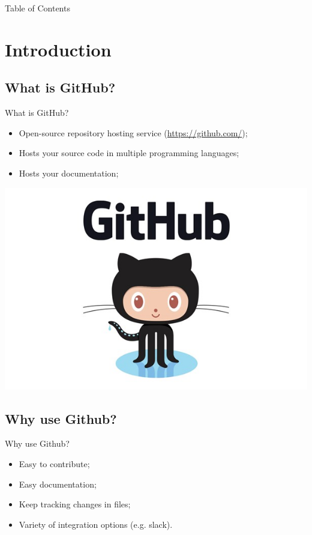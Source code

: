 \begin{noheadline}

\begin{frame}[allowframebreaks]{Table of Contents}

\tableofcontents

\end{frame}

\end{noheadline}


\section{Introduction}

\subsection{What is GitHub?}
\begin{frame}{What is GitHub?}
    \begin{itemize}

        \item Open-source repository hosting service (\href{https://github.com/}{https://github.com/});
        \item Hosts your source code in multiple programming languages;
        \item Hosts your documentation;        
    \end{itemize}
    \centering
    \includegraphics[scale=.3]{github}
\end{frame}

\subsection{Why use Github?}
\begin{frame}{Why use Github?}
\begin{itemize}
    \item Easy to contribute;
    \item Easy documentation;
    \item Keep tracking changes in files;
    \item Variety of integration options (e.g. slack).
\end{itemize}
\end{frame}


